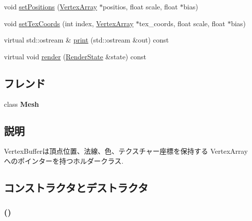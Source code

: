 \begin{CompactItemize}
\item 
void \hyperlink{classm3g_1_1VertexBuffer_527460407f488d5128bae7d0adb6da43}{setPositions} (\hyperlink{classm3g_1_1VertexArray}{VertexArray} $\ast$positios, float scale, float $\ast$bias)
\item 
void \hyperlink{classm3g_1_1VertexBuffer_9fd3dd3f78138d654d18863e4f1329f4}{setTexCoords} (int index, \hyperlink{classm3g_1_1VertexArray}{VertexArray} $\ast$tex\_\-coords, float scale, float $\ast$bias)
\item 
virtual std::ostream \& \hyperlink{classm3g_1_1VertexBuffer_6fea17fa1532df3794f8cb39cb4f911f}{print} (std::ostream \&out) const 
\item 
virtual void \hyperlink{classm3g_1_1VertexBuffer_8babc8a79b78615da51161e94029eea9}{render} (\hyperlink{structm3g_1_1RenderState}{RenderState} \&state) const 
\end{CompactItemize}
\subsection*{フレンド}
\begin{CompactItemize}
\item 
\hypertarget{classm3g_1_1VertexBuffer_a41a130f156b145bffb3f4b5172c4c93}{
class \textbf{Mesh}}
\label{classm3g_1_1VertexBuffer_a41a130f156b145bffb3f4b5172c4c93}

\end{CompactItemize}


\subsection{説明}
VertexBufferは頂点位置、法線、色、テクスチャー座標を保持する VertexArrayへのポインターを持つホルダークラス. 

\subsection{コンストラクタとデストラクタ}
\hypertarget{classm3g_1_1VertexBuffer_fd7b13840c99c57d27316c8f8434dc49}{
\subsubsection[{VertexBuffer}]{ ()}}
\label{classm3g_1_1VertexBuffer_fd7b13840c99c57d27316c8f8434dc49}


